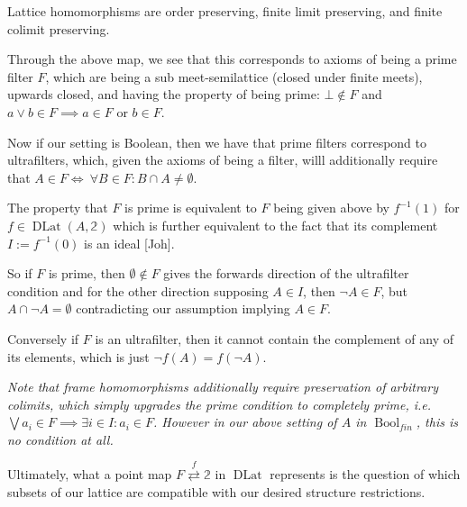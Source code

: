 \documentclass[12pt,a4paper]{article}
\DeclareMathOperator{\Bool}{Bool}
\DeclareMathOperator{\DLat}{DLat}
\begin{document}
Lattice homomorphisms are  order preserving, finite limit preserving, and finite colimit preserving. 

Through the above map, we see that this corresponds to axioms of being a prime filter $F$, which are being a sub meet-semilattice (closed under finite meets), upwards closed, and having the property of being prime: $\bot \notin F$ and $a \lor b \in F \implies a \in F $ or $b \in F$.



Now if our setting is Boolean, then we have that prime filters correspond to ultrafilters, which, given the axioms of being a filter, willl additionally  require that $A \in F \iff \ \forall B \in F: B \cap A \neq \emptyset$. 

The property that $F$ is prime is equivalent to $F$ being given above by $f^{-1}(1)$ for $f \in \DLat(A, \mathbb{2})$ which is further equivalent to the fact that its complement $I:= f^{-1}(0)$ is an ideal [Joh]. 

So if $F$ is prime, then $\emptyset \notin F$ gives the forwards direction of the ultrafilter condition and for the other direction supposing $A \in I$, then $\neg A \in F $, but  $A \cap \neg A = \emptyset$ contradicting our assumption implying $A \in F$.

Conversely if $F$ is an ultrafilter, then it cannot contain the complement of any of its elements, which is just $\neg f(A) = f(\neg A)$.



\emph{Note that frame homomorphisms additionally require preservation of arbitrary colimits, which simply upgrades the prime condition to completely prime, i.e. $\bigvee a_i \in F \implies \exists i \in I: a_i \in F$. However in our above setting of $A$ in $\Bool_{fin}$, this is no condition at all.
}

Ultimately, what a point map  $F \stackrel{f}{\rightleftarrows} \mathbb{2}$ in $\DLat$ represents is the question of which subsets of our lattice are compatible with our desired structure restrictions. 
\end{document}
